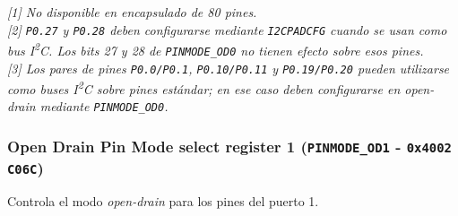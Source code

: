 \noindent\textit{[1] No disponible en encapsulado de 80 pines.}\\
\textit{[2] \texttt{P0.27} y \texttt{P0.28} deben configurarse mediante \texttt{I2CPADCFG} cuando se usan como bus I\textsuperscript{2}C. Los bits 27 y 28 de \texttt{PINMODE\_OD0} no tienen efecto sobre esos pines.}\\
\textit{[3] Los pares de pines \texttt{P0.0/P0.1}, \texttt{P0.10/P0.11} y \texttt{P0.19/P0.20} pueden utilizarse como buses I\textsuperscript{2}C sobre pines estándar; en ese caso deben configurarse en \textit{open-drain} mediante \texttt{PINMODE\_OD0}.}

\subsubsection{Open Drain Pin Mode select register 1 (\texttt{PINMODE\_OD1} - \texttt{0x4002 C06C})}
Controla el modo \textit{open-drain} para los pines del puerto 1.

